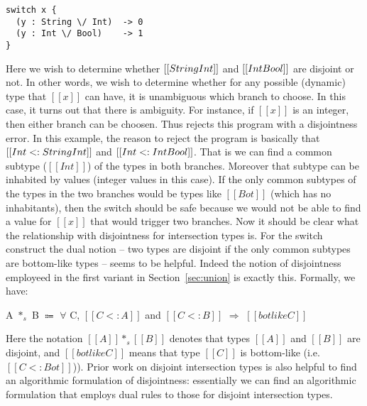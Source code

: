 \begin{lstlisting}
switch x {
  (y : String \/ Int)  -> 0
  (y : Int \/ Bool)    -> 1
}
\end{lstlisting}

\noindent Here we wish to determine whether $[[String \/ Int]]$ and $[[Int \/ Bool]]$
are disjoint or not. In other words, we wish to determine whether for any possible
(dynamic) type that $[[x]]$ can have, it is unambiguous which branch to choose.
In this case, it turns out that there is ambiguity. For instance, if $[[x]]$ is an integer,
then either branch can be choosen. Thus \cal rejects this program with a disjointness error.
In this example, the reason to reject the program is basically that $[[Int <: String \/ Int]]$
and $[[Int <: Int \/ Bool]]$. That is we can find a common subtype ($[[Int]]$) of the
types in both branches. Moreover that subtype can be inhabited by values (integer values
in this case). If the only common subtypes of the types in the two branches
would be types like $[[Bot]]$ (which has no inhabitants), then the switch should
be safe because we would not be able to find a value for $[[x]]$ that would trigger
two branches. Now it should be clear what the relationship with disjointness for intersection
types is. For the switch construct the dual notion -- two types are disjoint if the only
common subtypes are bottom-like types -- seems to be helpful.
Indeed the notion of disjointness employeed in the first variant \cal in Section~\ref{sec:union}
is exactly this. Formally, we have:

\begin{definition}\label{def:disjointness}
	A $*_s$ B $\Coloneqq$ $\forall$ C, $[[C <: A]]$ and $[[C <: B]]$ $\Longrightarrow$ $[[botlike C]]$
	\label{def:union:disj}
\end{definition}

\noindent Here the notation $[[A]] *_s [[B]]$ denotes that types $[[A]]$ and $[[B]]$ are disjoint,
and $[[botlike C]]$ means that type $[[C]]$ is bottom-like (i.e. $[[C <: Bot]]$)).
Prior work on disjoint intersection types is also helpful
to find an algorithmic formulation of disjointness: essentially we can find an algorithmic
formulation that employs dual rules to those for disjoint intersection types.

